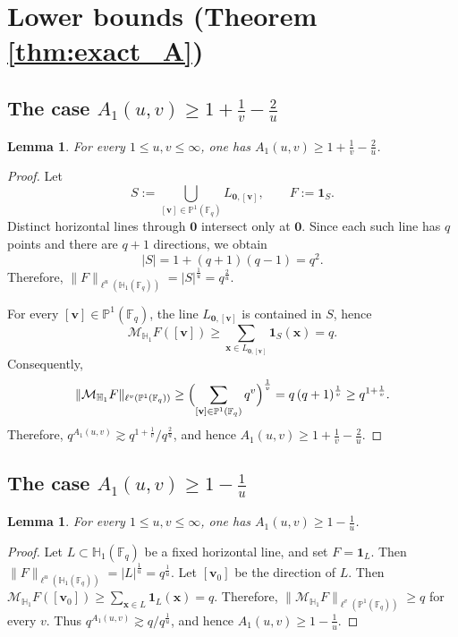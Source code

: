\documentclass[11pt]{article}
\newtheorem{lemma}[theorem]{Lemma}
\newcommand{\1}{\mathbf 1}
\newcommand{\bfv}{\mathbf{v}}
\begin{document}
\section{Lower bounds (Theorem \ref{thm:exact_A})}\label{section5}


\subsection{The case $A_1(u, v)\ge 1+\frac{1}{v}-\frac{2}{u}$}

\begin{lemma}
\label{lem:lb-fan}
For every $1\le u,v\le\infty$, one has $A_1(u, v)\ge 1+\frac1v-\frac{2}{u}$.
\end{lemma}

\begin{proof}
Let
\[
S:=\bigcup_{[\mathbf{v}]\in\mathbb{P}^1(\mathbb{F}_q)} L_{\mathbf{0}, [\mathbf{v}]},
\qquad
F:=\mathbf{1}_S.
\]
Distinct horizontal lines through $\mathbf{0}$ intersect only at $\mathbf{0}$.
Since each such line has $q$ points and there are $q+1$ directions, we obtain
\[
|S|=1+(q+1)(q-1)=q^2.
\]
Therefore, $\|F\|_{\ell^u(\mathbb{H}_1(\mathbb{F}_q))}=|S|^{\frac{1}{u}}=q^{\frac{2}{u}}$.

For every $[\mathbf{v}]\in\mathbb{P}^1(\mathbb{F}_q)$, the line $L_{\mathbf{0}, [\bfv]}$ is contained in $S$, hence
\[
\mathcal{M}_{\mathbb{H}_1} F([\mathbf{v}])\ge \sum_{\mathbf x\in L_{\mathbf{0}, [\mathbf{v}]}}\mathbf{1}_S(\mathbf x)=q.
\]
Consequently,
\[
\|\mathcal{M}_{\mathbb{H}_1} F\|_{\ell^v(\mathbb{P}^1(\mathbb{F}_q))}
\ge
\Bigl(\sum_{[\mathbf{v}]\in\mathbb{P}^1(\mathbb{F}_q)} q^v\Bigr)^{\frac{1}{v}}
=
q\,(q+1)^{\frac{1}{v}}
\ge  q^{1+\frac{1}{v}}.
\]
Therefore, $q^{A_1(u, v)}\gtrsim q^{1+\frac{1}{v}}/q^{\frac{2}{u}}$, and hence $A_1(u, v)\ge 1+\frac1v-\frac{2}{u}$.
\end{proof}

\subsection{The case $A_1(u, v)\ge 1-\frac{1}{u}$}

\begin{lemma}
\label{lem:lb-line}
For every $1\le u,v\le\infty$, one has $A_1(u, v)\ge 1-\frac1u$.
\end{lemma}

\begin{proof}
Let $L\subset\mathbb{H}_1(\mathbb{F}_q)$ be a fixed horizontal line, and set $F=\mathbf{1}_L$.
Then $\|F\|_{\ell^u(\mathbb{H}_1(\mathbb{F}_q))}=|L|^{\frac{1}{u}}=q^{\frac{1}{u}}$.
Let $[\mathbf{v}_0]$ be the direction of $L$. 
Then $\mathcal{M}_{\mathbb{H}_1} F([\mathbf v_0])\ge \sum\limits_{\mathbf x\in L}\mathbf{1}_L(\mathbf x)=q$.
Therefore, $\|\mathcal{M}_{\mathbb{H}_1} F\|_{\ell^v(\mathbb{P}^1(\mathbb{F}_q))}\ge q$ for every $v$.
Thus $q^{A_1(u, v)}\gtrsim q/q^{\frac{1}{u}}$, and hence $A_1(u, v)\ge 1-\frac{1}{u}$.
\end{proof}
\end{document}
